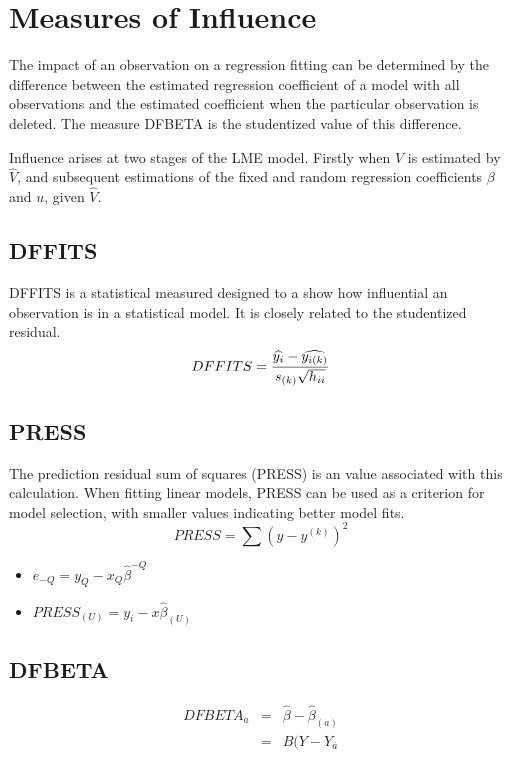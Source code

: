 \documentclass[00-ResidualsMain.tex]{subfiles}
\begin{document}
	\newpage


\newpage
\section{Measures of Influence} %

The impact of an observation on a regression fitting can be determined by the difference between the estimated regression coefficient of a model with all observations and the estimated coefficient when the particular observation is deleted. The measure DFBETA is the studentized value of this difference.

Influence arises at two stages of the LME model. Firstly when $V$ is estimated by $\hat{V}$, and subsequent
estimations of the fixed and random regression coefficients $\beta$ and $u$, given $\hat{V}$.


\subsection{DFFITS} %
DFFITS is a statistical measured designed to a show how influential an observation is in a statistical model. It is closely related to the studentized residual.
\begin{displaymath} DFFITS = {\widehat{y_i} -
\widehat{y_{i(k)}} \over s_{(k)} \sqrt{h_{ii}}} \end{displaymath}


\subsection{PRESS} %
The prediction residual sum of squares (PRESS) is an value associated with this calculation. When fitting linear models, PRESS can be used as a criterion for model selection, with smaller values indicating better model fits.
\begin{equation}
PRESS = \sum(y-y^{(k)})^2
\end{equation}


\begin{itemize}
\item $e_{-Q} = y_{Q} - x_{Q}\hat{\beta}^{-Q}$
\item $PRESS_{(U)} = y_{i} - x\hat{\beta}_{(U)}$
\end{itemize}

\subsection{DFBETA} %
\begin{eqnarray}
DFBETA_{a} &=& \hat{\beta} - \hat{\beta}_{(a)} \\
&=& B(Y-Y_{\bar{a}}
\end{eqnarray}
\end{document}

